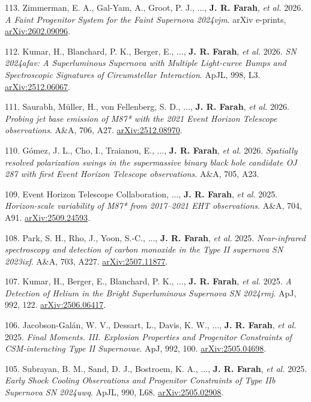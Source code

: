 \documentclass[margin,line]{res}
\newcommand{\apj}{ApJ}                    %
\newcommand{\apjl}{ApJL}                  %
\newcommand{\aap}{A\&A}                   %
\begin{document}
\begin{resume}
113. Zimmerman, E. A., Gal-Yam, A., Groot, P. J., ..., \textbf{J. R. Farah}, \textit{et al.} 2026. \textit{A Faint Progenitor System for the Faint Supernova 2024vjm}. arXiv e-prints, \href{https://arxiv.org/abs/2602.09096}{arXiv:2602.09096}.

112. Kumar, H., Blanchard, P. K., Berger, E., ..., \textbf{J. R. Farah}, \textit{et al.} 2026. \textit{SN 2024afav: A Superluminous Supernova with Multiple Light-curve Bumps and Spectroscopic Signatures of Circumstellar Interaction}. \apjl, 998, L3. \href{https://arxiv.org/abs/2512.06067}{arXiv:2512.06067}.

111. Saurabh, M{\"u}ller, H., von Fellenberg, S. D., ..., \textbf{J. R. Farah}, \textit{et al.} 2026. \textit{Probing jet base emission of M87* with the 2021 Event Horizon Telescope observations}. \aap, 706, A27. \href{https://arxiv.org/abs/2512.08970}{arXiv:2512.08970}.

110. G{\'o}mez, J. L., Cho, I., Traianou, E., ..., \textbf{J. R. Farah}, \textit{et al.} 2026. \textit{Spatially resolved polarization swings in the supermassive binary black hole candidate OJ 287 with first Event Horizon Telescope observations}. \aap, 705, A23.

109. Event Horizon Telescope Collaboration, ..., \textbf{J. R. Farah}, \textit{et al.} 2025. \textit{Horizon-scale variability of M87* from 2017--2021 EHT observations}. \aap, 704, A91. \href{https://arxiv.org/abs/2509.24593}{arXiv:2509.24593}.

108. Park, S. H., Rho, J., Yoon, S.-C., ..., \textbf{J. R. Farah}, \textit{et al.} 2025. \textit{Near-infrared spectroscopy and detection of carbon monoxide in the Type II supernova SN 2023ixf}. \aap, 703, A227. \href{https://arxiv.org/abs/2507.11877}{arXiv:2507.11877}.

107. Kumar, H., Berger, E., Blanchard, P. K., ..., \textbf{J. R. Farah}, \textit{et al.} 2025. \textit{A Detection of Helium in the Bright Superluminous Supernova SN 2024rmj}. \apj, 992, 122. \href{https://arxiv.org/abs/2506.06417}{arXiv:2506.06417}.

106. Jacobson-Gal{\'a}n, W. V., Dessart, L., Davis, K. W., ..., \textbf{J. R. Farah}, \textit{et al.} 2025. \textit{Final Moments. III. Explosion Properties and Progenitor Constraints of CSM-interacting Type II Supernovae}. \apj, 992, 100. \href{https://arxiv.org/abs/2505.04698}{arXiv:2505.04698}.

105. Subrayan, B. M., Sand, D. J., Bostroem, K. A., ..., \textbf{J. R. Farah}, \textit{et al.} 2025. \textit{Early Shock Cooling Observations and Progenitor Constraints of Type IIb Supernova SN 2024uwq}. \apjl, 990, L68. \href{https://arxiv.org/abs/2505.02908}{arXiv:2505.02908}.


\end{resume}
\end{document}
